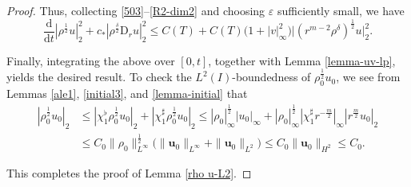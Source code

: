 \documentclass[11pt,reqno]{amsart}
\numberwithin{rk}{section}
\numberwithin{prop}{section}
\numberwithin{mydef}{section}
\numberwithin{lem}{section}
\numberwithin{equation}{section}
\numberwithin{thm}{section}
\begin{document}
\begin{proof}
Thus, collecting \eqref{503}--\eqref{R2-dim2} and choosing $\varepsilon$ sufficiently small, we have 
\begin{equation*} 
\frac{\mathrm{d}}{\mathrm{d}t}|\rho^\frac{1}{2}u|_2^2+c_* |\rho^\frac{\delta}{2}\mathrm{D}_r u|_2^2 \leq C(T)+C(T)\big(1+|v|_\infty^2\big)\big|(r^{m-2}\rho^\delta)^\frac{1}{2}u\big|_2^2.
\end{equation*}

Finally, integrating the above over $[0,t]$, together with Lemma \ref{lemma-uv-lp}, yields the desired result. To check the $L^2(I)$-boundedness of $\rho_0^{\frac{1}{2}}u_0$, we see from Lemmas \ref{ale1}, \ref{initial3}, and \ref{lemma-initial} that
\begin{equation*}
\begin{aligned}
|\rho_0^\frac{1}{2}u_0|_2&\leq |\chi_1^\flat \rho_0^\frac{1}{2}u_0|_2+|\chi_1^\sharp \rho_0^\frac{1}{2}u_0|_2\leq |\rho_0|_\infty^\frac{1}{2}|u_0|_\infty+ |\rho_0|_\infty^\frac{1}{2}|\chi_1^\sharp r^{-\frac{m}{2}}|_\infty |r^\frac{m}{2}u_0|_2\\
&\leq C_0\|\rho_0\|_{L^\infty}^\frac{1}{2}\big(\|\boldsymbol{u}_0\|_{L^\infty}+\|\boldsymbol{u}_0\|_{L^2}\big)\leq C_0\|\boldsymbol{u}_0\|_{H^2}\leq C_0.
\end{aligned}
\end{equation*}

This completes the proof of Lemma \ref{rho u-L2}.
\end{proof}
\end{document}
